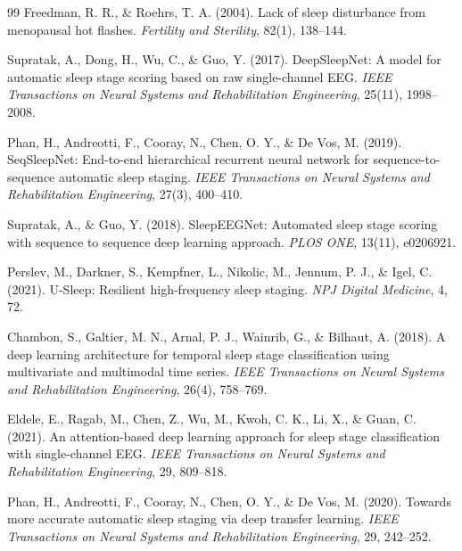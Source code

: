 \documentclass[ASNA,twocolumn]{USG}
\begin{document}
\begin{thebibliography}{99}
 Freedman, R. R., \& Roehrs, T. A. (2004). Lack of sleep disturbance from menopausal hot flashes. \textit{Fertility and Sterility}, 82(1), 138--144.

 Supratak, A., Dong, H., Wu, C., \& Guo, Y. (2017). DeepSleepNet: A model for automatic sleep stage scoring based on raw single-channel EEG. \textit{IEEE Transactions on Neural Systems and Rehabilitation Engineering}, 25(11), 1998--2008.

 Phan, H., Andreotti, F., Cooray, N., Chen, O. Y., \& De Vos, M. (2019). SeqSleepNet: End-to-end hierarchical recurrent neural network for sequence-to-sequence automatic sleep staging. \textit{IEEE Transactions on Neural Systems and Rehabilitation Engineering}, 27(3), 400--410.

 Supratak, A., \& Guo, Y. (2018). SleepEEGNet: Automated sleep stage scoring with sequence to sequence deep learning approach. \textit{PLOS ONE}, 13(11), e0206921.

 Perslev, M., Darkner, S., Kempfner, L., Nikolic, M., Jennum, P. J., \& Igel, C. (2021). U-Sleep: Resilient high-frequency sleep staging. \textit{NPJ Digital Medicine}, 4, 72.

 Chambon, S., Galtier, M. N., Arnal, P. J., Wainrib, G., \& Bilhaut, A. (2018). A deep learning architecture for temporal sleep stage classification using multivariate and multimodal time series. \textit{IEEE Transactions on Neural Systems and Rehabilitation Engineering}, 26(4), 758--769.

 Eldele, E., Ragab, M., Chen, Z., Wu, M., Kwoh, C. K., Li, X., \& Guan, C. (2021). An attention-based deep learning approach for sleep stage classification with single-channel EEG. \textit{IEEE Transactions on Neural Systems and Rehabilitation Engineering}, 29, 809--818.

 Phan, H., Andreotti, F., Cooray, N., Chen, O. Y., \& De Vos, M. (2020). Towards more accurate automatic sleep staging via deep transfer learning. \textit{IEEE Transactions on Neural Systems and Rehabilitation Engineering}, 29, 242--252.

\end{thebibliography}
\end{document}

